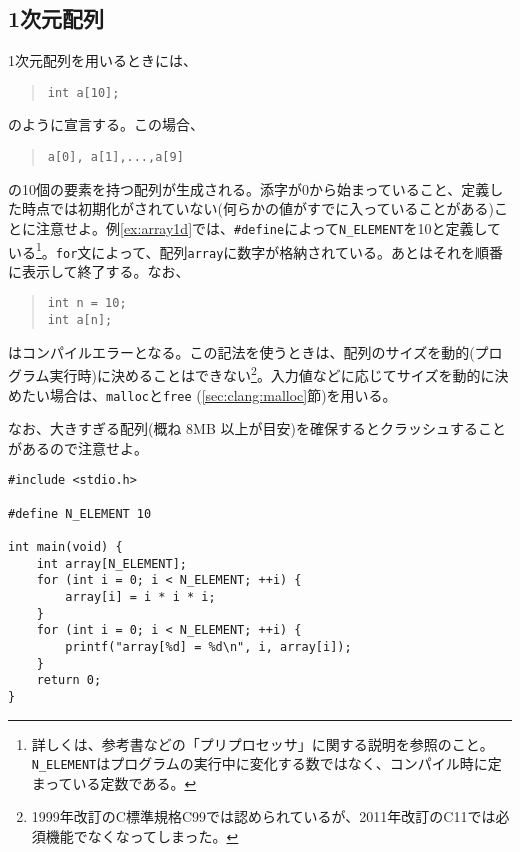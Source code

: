 \subsection{1次元配列}
1次元配列を用いるときには、
\begin{quote}
    \begin{verbatim}
int a[10];
\end{verbatim}
\end{quote}
のように宣言する。この場合、
\begin{quote}
    \begin{verbatim}
a[0], a[1],...,a[9]
\end{verbatim}
\end{quote}
の10個の要素を持つ配列が生成される。添字が0から始まっていること、定義した時点では初期化がされていない(何らかの値がすでに入っていることがある)ことに注意せよ。例\ref{ex:array1d}では、\texttt{\#define}によって\texttt{N\_ELEMENT}を10と定義している\footnote{詳しくは、参考書などの「プリプロセッサ」に関する説明を参照のこと。\texttt{N\_ELEMENT}はプログラムの実行中に変化する数ではなく、コンパイル時に定まっている定数である。}。\texttt{for}文によって、配列\texttt{array}に数字が格納されている。あとはそれを順番に表示して終了する。なお、
\begin{quote}
    \begin{verbatim}
int n = 10;
int a[n];
\end{verbatim}
\end{quote}
はコンパイルエラーとなる。この記法を使うときは、配列のサイズを動的(プログラム実行時)に決めることはできない\footnote{1999年改訂のC標準規格C99では認められているが、2011年改訂のC11では必須機能でなくなってしまった。}。入力値などに応じてサイズを動的に決めたい場合は、\texttt{malloc}と\texttt{free} (\ref{sec:clang:malloc}節)を用いる。

なお、大きすぎる配列(概ね 8MB 以上が目安)を確保するとクラッシュすることがあるので注意せよ。
\begin{reidai}\label{ex:array1d}
    \begin{verbatim}
#include <stdio.h>

#define N_ELEMENT 10

int main(void) {
    int array[N_ELEMENT];
    for (int i = 0; i < N_ELEMENT; ++i) {
        array[i] = i * i * i;
    }
    for (int i = 0; i < N_ELEMENT; ++i) {
        printf("array[%d] = %d\n", i, array[i]);
    }
    return 0;
}
\end{verbatim}
\end{reidai}

